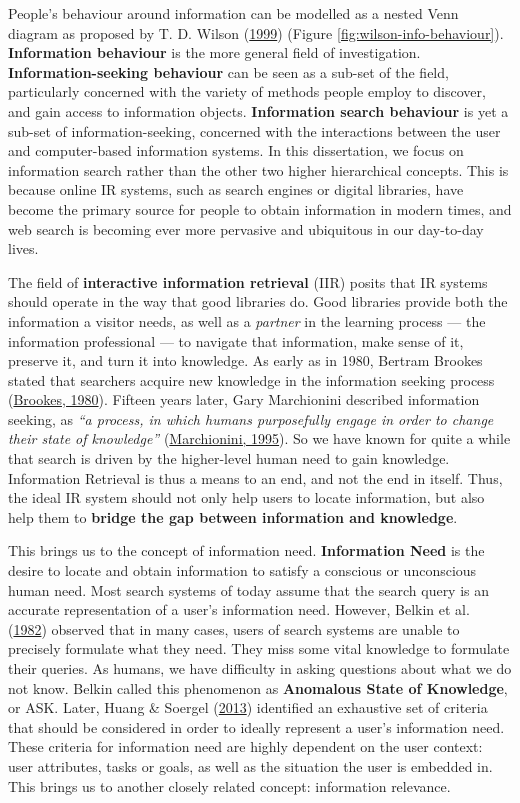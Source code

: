 \documentclass[letterpaper, nobind]{templates/ociamthesis}
\begin{document}
People's behaviour around information can be modelled as a nested Venn
diagram as proposed by T. D. Wilson (\protect\hyperlink{ref-wilson1999models}{1999}) (Figure
\ref{fig:wilson-info-behaviour}). \textbf{Information behaviour} is
the more general field of investigation. \textbf{Information-seeking
behaviour} can be seen as a sub-set of the field, particularly
concerned with the variety of methods people employ to discover, and
gain access to information objects. \textbf{Information search behaviour} is
yet a sub-set of information-seeking, concerned with the interactions
between the user and computer-based information systems. In this
dissertation, we focus on information search rather than the other two
higher hierarchical concepts. This is because online IR systems, such as
search engines or digital libraries, have become the primary source for
people to obtain information in modern times, and web search is becoming
ever more pervasive and ubiquitous in our day-to-day lives.

The field of \textbf{interactive information retrieval} (IIR) posits that IR
systems should operate in the way that good libraries do. Good libraries
provide both the information a visitor needs, as well as a \emph{partner} in
the learning process --- the information professional --- to navigate
that information, make sense of it, preserve it, and turn it into
knowledge. As early as in 1980, Bertram Brookes stated that searchers
acquire new knowledge in the information seeking process
(\protect\hyperlink{ref-brookes1980foundations}{Brookes, 1980}). Fifteen years later, Gary Marchionini
described information seeking, as \emph{``a process, in which humans
purposefully engage in order to change their state of knowledge''}
(\protect\hyperlink{ref-marchionini1995information}{Marchionini, 1995}). So we have known for quite a while that
search is driven by the higher-level human need to gain knowledge.
Information Retrieval is thus a means to an end, and not the end in
itself. Thus, the ideal IR system should not only help users to locate
information, but also help them to \textbf{bridge the gap between information
and knowledge}.

This brings us to the concept of information need. \textbf{Information Need}
is the desire to locate and obtain information to satisfy a conscious or
unconscious human need. Most search systems of today assume that the
search query is an accurate representation of a user's information need.
However, Belkin et al. (\protect\hyperlink{ref-belkin1982ask}{1982}) observed that in many cases, users of search
systems are unable to precisely formulate what they need. They miss some
vital knowledge to formulate their queries. As humans, we have
difficulty in asking questions about what we do not know. Belkin called
this phenomenon as \textbf{Anomalous State of Knowledge}, or ASK. Later,
Huang \& Soergel (\protect\hyperlink{ref-huang2013relevance}{2013}) identified an exhaustive set of criteria that
should be considered in order to ideally represent a user's information
need. These criteria for information need are highly dependent on the
user context: user attributes, tasks or goals, as well as the situation
the user is embedded in. This brings us to another closely related
concept: information relevance.
\end{document}
